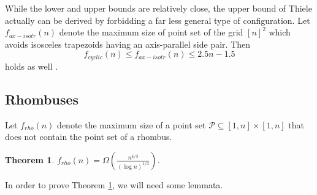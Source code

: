 \documentclass[11pt]{article}
\theoremstyle{plain}
\newtheorem{theorem}{\bf Theorem}[section]
\newtheorem{prop}[theorem]{\bf Proposition}
\newcommand\cG{{\mathcal G}}
\newcommand\cP{{\mathcal P}}
\newcommand{\E}{\mathbb{E}}
\begin{document}
	While the lower and upper bounds are relatively close,  the upper bound of Thiele actually can be derived by forbidding a far less general type of configuration.  Let $f_{ax-isotr}(n)$ denote the maximum size  of point set of the grid $[n]^2$ which  avoids isosceles trapezoids having an axis-parallel side pair.  Then
	\begin{equation}
		f_{cyclic}(n)\le f_{ax-isotr}(n)\le 2.5n-1.5 
	\end{equation}holds as well \cite{Thiele2}.
	
	
	\subsection{Rhombuses}
	
	
	Let 
	$f_{rho}(n)$ denote the maximum size of a point set $ \cP \subseteq [1,n] \times [1,n] $ that does not contain the point set of a rhombus.
	
	
	\begin{theorem}\label{rhombus}
		$f_{rho}(n)= \Omega\left(\frac{n^{4/3}}{(\log n)^{1/3}}\right)$.
	\end{theorem}
	
	
	
	
	In order to prove Theorem \ref{rhombus}, we will need some lemmata.
	
\end{document}
